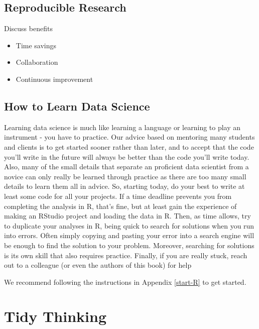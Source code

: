 \documentclass[
]{book}
\providecommand{\tightlist}{%
  \setlength{\itemsep}{0pt}\setlength{\parskip}{0pt}}
\begin{document}
\hypertarget{reproducible-research-1}{%
\section{Reproducible Research}\label{reproducible-research-1}}

Discuss benefits

\begin{itemize}
\tightlist
\item
  Time savings
\item
  Collaboration
\item
  Continuous improvement
\end{itemize}

\hypertarget{how-to-learn-data-science}{%
\section{How to Learn Data Science}\label{how-to-learn-data-science}}

Learning data science is much like learning a language or learning to play an instrument - you have to practice. Our advice based on mentoring many students and clients is to get started sooner rather than later, and to accept that the code you'll write in the future will always be better than the code you'll write today. Also, many of the small details that separate an proficient data scientist from a novice can only really be learned through practice as there are too many small details to learn them all in advice. So, starting today, do your best to write at least some code for all your projects. If a time deadline prevents you from completing the analysis in R, that's fine, but at least gain the experience of making an RStudio project and loading the data in R. Then, as time allows, try to duplicate your analyses in R, being quick to search for solutions when you run into errors. Often simply copying and pasting your error into a search engine will be enough to find the solution to your problem. Moreover, searching for solutions is its own skill that also requires practice. Finally, if you are really stuck, reach out to a colleague (or even the authors of this book) for help

We recommend following the instructions in Appendix \ref{start-R} to get started.

\hypertarget{tidy-thoughts}{%
\chapter{Tidy Thinking}\label{tidy-thoughts}}
\end{document}

